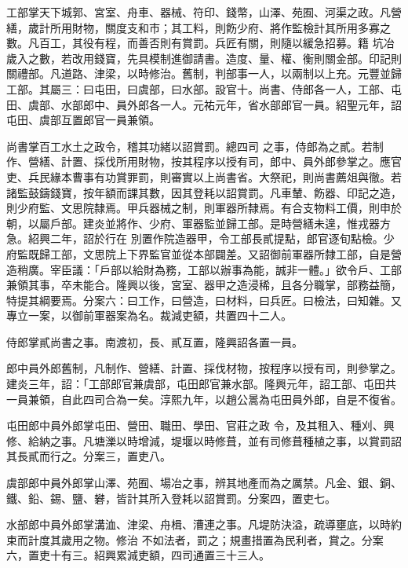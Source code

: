 \begin{pinyinscope}
 工部掌天下城郭、宮室、舟車、器械、符印、錢幣，山澤、苑囿、河渠之政。凡營繕，歲計所用財物，關度支和市；其工料，則飭少府、將作監檢計其所用多寡之數。凡百工，其役有程，而善否則有賞罰。兵匠有關，則隨以緩急招募。籍
 坑冶歲入之數，若改用錢寶，先具模制進御請書。造度、量、權、衡則關金部。印記則關禮部。凡道路、津梁，以時修治。舊制，判部事一人，以兩制以上充。元豐並歸工部。其屬三：曰屯田，曰虞部，曰水部。設官十。尚書、侍郎各一人，工部、屯田、虞部、水部郎中、員外郎各一人。元祐元年，省水部郎官一員。紹聖元年，詔屯田、虞部互置郎官一員兼領。



 尚書掌百工水土之政令，稽其功緒以詔賞罰。總四司
 之事，侍郎為之貳。若制作、營繕、計置、採伐所用財物，按其程序以授有司，郎中、員外郎參掌之。應官吏、兵民緣本曹事有功賞罪罰，則審實以上尚書省。大祭祀，則尚書薦俎與徹。若諸監鼓鑄錢寶，按年額而課其數，因其登耗以詔賞罰。凡車輦、飭器、印記之造，則少府監、文思院隸焉。甲兵器械之制，則軍器所隸焉。有合支物料工價，則申於朝，以屬戶部。建炎並將作、少府、軍器監並歸工部。是時營繕未遑，惟戎器方急。紹興二年，詔於行在
 別置作院造器甲，令工部長貳提點，郎官逐旬點檢。少府監既歸工部，文思院上下界監官並從本部闢差。又詔御前軍器所隸工部，自是營造稍廣。宰臣議：「戶部以給財為務，工部以辦事為能，誠非一體。」欲令戶、工部兼領其事，卒未能合。隆興以後，宮室、器甲之造浸稀，且各分職掌，部務益簡，特提其綱要焉。分案六：曰工作，曰營造，曰材料，曰兵匠。曰檢法，曰知雜。又專立一案，以御前軍器案為名。裁減吏額，共置四十二人。



 侍郎掌貳尚書之事。南渡初，長、貳互置，隆興詔各置一員。



 郎中員外郎舊制，凡制作、營繕、計置、採伐材物，按程序以授有司，則參掌之。建炎三年，詔：「工部郎官兼虞部，屯田郎官兼水部。隆興元年，詔工部、屯田共一員兼領，自此四司合為一矣。淳熙九年，以趙公暠為屯田員外郎，自是不復省。



 屯田郎中員外郎掌屯田、營田、職田、學田、官莊之政
 令，及其租入、種刈、興修、給納之事。凡塘濼以時增減，堤堰以時修葺，並有司修葺種植之事，以賞罰詔其長貳而行之。分案三，置吏八。



 虞部郎中員外郎掌山澤、苑囿、場冶之事，辨其地產而為之厲禁。凡金、銀、銅、鐵、鉛、錫、鹽、礬，皆計其所入登耗以詔賞罰。分案四，置吏七。



 水部郎中員外郎掌溝洫、津梁、舟楫、漕連之事。凡堤防決溢，疏導壅底，以時約束而計度其歲用之物。修治
 不如法者，罰之；規畫措置為民利者，賞之。分案六，置吏十有三。紹興累減吏額，四司通置三十三人。




\end{pinyinscope}
